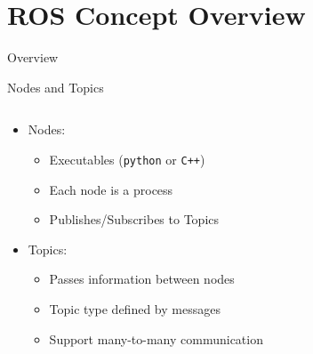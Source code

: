 \documentclass[aspectratio=43]{beamer}
\begin{document}
\section{ROS Concept Overview}
\begin{frame}[label=overview]{Overview}
	\tableofcontents[sectionstyle=show/shaded,subsectionstyle=show/shaded/shaded]
\end{frame}


\begin{frame}{Nodes and Topics}
	\begin{columns}[c]
		\begin{column}{0.5\textwidth}
			\begin{itemize}
				\item Nodes:
					\begin{itemize}
					\item Executables (\texttt{python} or \texttt{C++})
					\item Each node is a process
					\item Publishes/Subscribes to Topics
					\end{itemize}
				\item Topics:
					\begin{itemize}
					\item Passes information between nodes
					\item Topic type defined by messages
					\item Support many-to-many communication
					\end{itemize}
			\end{itemize}
		\end{column}
		\begin{column}{0.5\textwidth}
		\end{column}
	\end{columns}
\end{frame}
\end{document}
